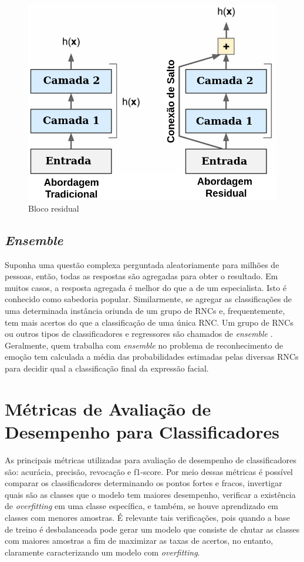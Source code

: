 \begin{figure}
\centering
\includegraphics[scale=0.36]{figuras/resnet-block-residual.png}
\caption{Bloco residual}
\label{fig:bloco-residual}
\end{figure}


\subsection{\textit{Ensemble}}
Suponha uma questão complexa perguntada aleatoriamente para milhões de pessoas, então, todas as respostas são agregadas para obter o resultado. Em muitos casos, a resposta agregada é melhor do que a de um especialista. Isto é conhecido como sabedoria popular. Similarmente, se agregar as classificações de uma determinada instância oriunda de um grupo de RNCs e, frequentemente, tem mais acertos do que a classificação de uma única RNC. Um grupo de RNCs ou outros tipos de classificadores e regressores são chamados de \textit{ensemble} \citep{geron2017hands}. Geralmente, quem trabalha com \textit{ensemble} no problema de reconhecimento de emoção tem calculada a média das probabilidades estimadas pelas diversas RNCs para decidir qual a classificação final da expressão facial.

\section{Métricas de Avaliação de Desempenho para Classificadores}\label{sec:metavalclass}
As principais métricas utilizadas para avaliação de desempenho de classificadores são: acurácia, precisão, revocação e f1-score. Por meio dessas métricas é possível comparar os classificadores determinando os pontos fortes e fracos, invertigar quais são as classes que o modelo tem maiores desempenho, verificar a existência de \textit{overfitting} em uma classe específica, e também, se houve aprendizado em classes com menores amostras. É relevante tais verificações, pois quando a base de treino é desbalanceada pode gerar um modelo que consiste de chutar as classes com maiores amostras a fim de maximizar as taxas de acertos, no entanto, claramente caracterizando um modelo com \textit{overfitting}.

